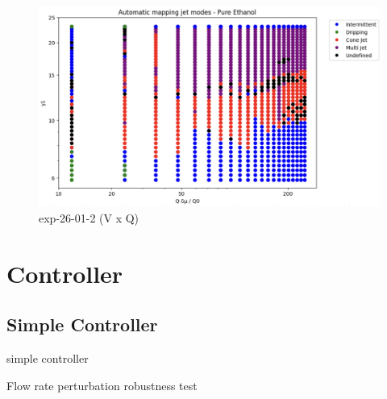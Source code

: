         \begin{figure}[H]
            \center
            \includegraphics[width=12cm]{Figuras/19:03/non-dimensional-1.png}
            \caption{ exp-26-01-2 (V x Q)}
        \end{figure}

\section{Controller}
\label{sec:controller_results}


    \subsection{Simple Controller}

        \begin{algorithm}
            \caption{simple controller}\label{alg:simple_controller}
            \begin{algorithmic}
                
                    \State {}
                    \State {}
                \EndIf

            \EndFunction
            \end{algorithmic}
        \end{algorithm}

        Flow rate perturbation robustness test

